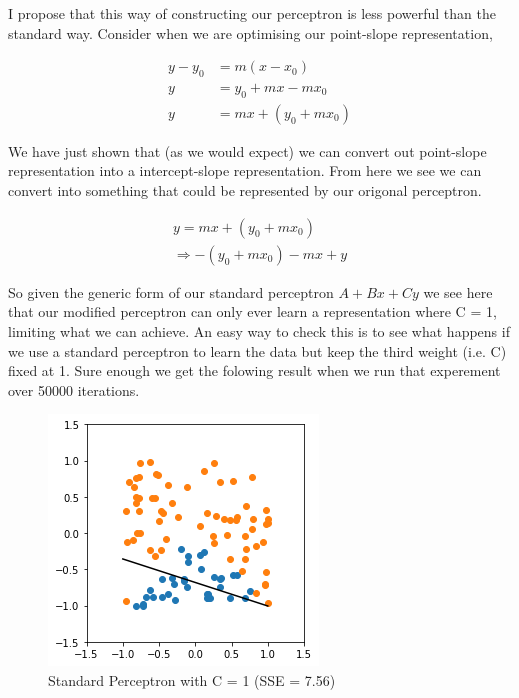 \documentclass{article}
\begin{document}
I propose that this way of constructing our perceptron is less powerful than the standard way. Consider when we are optimising our point-slope representation, 

\begin{align*}
y - y_0 &= m(x - x_0) \\
y &= y_0 + mx - mx_0 \\
y &= mx + (y_0 + mx_0)
\end{align*}

We have just shown that (as we would expect) we can convert out point-slope representation into a intercept-slope representation. From here we see we can convert into something that could be represented by our origonal perceptron.

\begin{align*}
y = mx + (y_0 + mx_0)\\
\Rightarrow -(y_0 + mx_0) -mx + y
\end{align*}

So given the generic form of our standard perceptron $A + Bx + Cy$ we see here that our modified perceptron can only ever learn a representation where C = 1, limiting what we can achieve. An easy way to check this is to see what happens if we use a standard perceptron to learn the data but keep the third weight (i.e. C) fixed at 1. Sure enough we get the folowing result when we run that experement over 50000 iterations.

\begin{figure}[H]
\centering
  \begin{minipage}[b]{0.4\textwidth}
    \includegraphics[width=\textwidth]{Standard-Perceptron-(C=1).png}
    \caption{Standard Perceptron with C = 1 (SSE = 7.56)}
  \end{minipage}
  \hfill
\end{figure}
\end{document}

